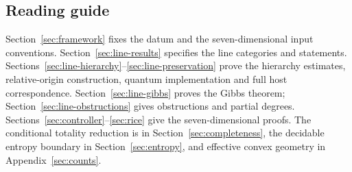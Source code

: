\subsection{Reading guide}
Section~\ref{sec:framework} fixes the datum and the seven-dimensional input
conventions. Section~\ref{sec:line-results} specifies the line categories
and statements. Sections~\ref{sec:line-hierarchy}--\ref{sec:line-preservation}
prove the hierarchy estimates, relative-origin construction, quantum
implementation and full host correspondence.
Section~\ref{sec:line-gibbs} proves the Gibbs theorem;
Section~\ref{sec:line-obstructions} gives obstructions and partial degrees.
Sections~\ref{sec:controller}--\ref{sec:rice} give the seven-dimensional
proofs. The conditional totality reduction is in
Section~\ref{sec:completeness}, the decidable entropy boundary in
Section~\ref{sec:entropy}, and effective convex geometry in
Appendix~\ref{sec:counts}.
